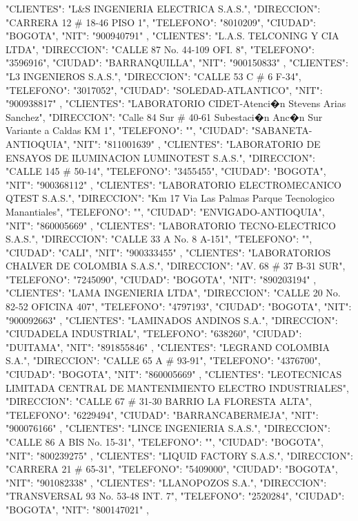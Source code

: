    {
   "CLIENTES": "L&S INGENIERIA ELECTRICA S.A.S.",
   "DIRECCION": "CARRERA 12 # 18-46 PISO 1",
   "TELEFONO": "8010209",
   "CIUDAD": "BOGOTA",
   "NIT": "900940791"
   },
   {
   "CLIENTES": "L.A.S. TELCONING Y CIA LTDA",
   "DIRECCION": "CALLE 87 No. 44-109 OFI. 8",
   "TELEFONO": "3596916",
   "CIUDAD": "BARRANQUILLA",
   "NIT": "900150833"
   },
   {
   "CLIENTES": "L3 INGENIEROS S.A.S.",
   "DIRECCION": "CALLE 53 C # 6 F-34",
   "TELEFONO": "3017052",
   "CIUDAD": "SOLEDAD-ATLANTICO",
   "NIT": "900938817"
   },
   {
   "CLIENTES": "LABORATORIO CIDET-Atenci�n Stevens Arias Sanchez",
   "DIRECCION": "Calle 84 Sur # 40-61 Subestaci�n Anc�n Sur Variante a Caldas KM 1",
   "TELEFONO": "",
   "CIUDAD": "SABANETA-ANTIOQUIA",
   "NIT": "811001639"
   },
   {
   "CLIENTES": "LABORATORIO DE ENSAYOS DE ILUMINACION LUMINOTEST S.A.S.",
   "DIRECCION": "CALLE 145 # 50-14",
   "TELEFONO": "3455455",
   "CIUDAD": "BOGOTA",
   "NIT": "900368112"
   },
   {
   "CLIENTES": "LABORATORIO ELECTROMECANICO QTEST S.A.S.",
   "DIRECCION": "Km 17 Via Las Palmas Parque Tecnologico Manantiales",
   "TELEFONO": "",
   "CIUDAD": "ENVIGADO-ANTIOQUIA",
   "NIT": "860005669"
   },
   {
   "CLIENTES": "LABORATORIO TECNO-ELECTRICO S.A.S.",
   "DIRECCION": "CALLE 33 A No. 8 A-151",
   "TELEFONO": "",
   "CIUDAD": "CALI",
   "NIT": "900333455"
   },
   {
   "CLIENTES": "LABORATORIOS CHALVER DE COLOMBIA S.A.S.",
   "DIRECCION": "AV. 68 # 37 B-31 SUR",
   "TELEFONO": "7245090",
   "CIUDAD": "BOGOTA",
   "NIT": "890203194"
   },
   {
   "CLIENTES": "LAMA INGENIERIA LTDA",
   "DIRECCION": "CALLE 20 No. 82-52 OFICINA 407",
   "TELEFONO": "4797193",
   "CIUDAD": "BOGOTA",
   "NIT": "900092663"
   },
   {
   "CLIENTES": "LAMINADOS ANDINOS S.A.",
   "DIRECCION": "CIUDADELA INDUSTRIAL",
   "TELEFONO": "638260",
   "CIUDAD": "DUITAMA",
   "NIT": "891855846"
   },
   {
   "CLIENTES": "LEGRAND COLOMBIA S.A.",
   "DIRECCION": "CALLE 65 A # 93-91",
   "TELEFONO": "4376700",
   "CIUDAD": "BOGOTA",
   "NIT": "860005669"
   },
   {
   "CLIENTES": "LEOTECNICAS LIMITADA CENTRAL DE MANTENIMIENTO ELECTRO INDUSTRIALES",
   "DIRECCION": "CALLE 67 # 31-30 BARRIO LA FLORESTA ALTA",
   "TELEFONO": "6229494",
   "CIUDAD": "BARRANCABERMEJA",
   "NIT": "900076166"
   },
   {
   "CLIENTES": "LINCE INGENIERIA S.A.S.",
   "DIRECCION": "CALLE 86 A BIS No. 15-31",
   "TELEFONO": "",
   "CIUDAD": "BOGOTA",
   "NIT": "800239275"
   },
   {
   "CLIENTES": "LIQUID FACTORY S.A.S.",
   "DIRECCION": "CARRERA 21 # 65-31",
   "TELEFONO": "5409000",
   "CIUDAD": "BOGOTA",
   "NIT": "901082338"
   },
   {
   "CLIENTES": "LLANOPOZOS S.A.",
   "DIRECCION": "TRANSVERSAL 93 No. 53-48 INT. 7",
   "TELEFONO": "2520284",
   "CIUDAD": "BOGOTA",
   "NIT": "800147021"
   },
